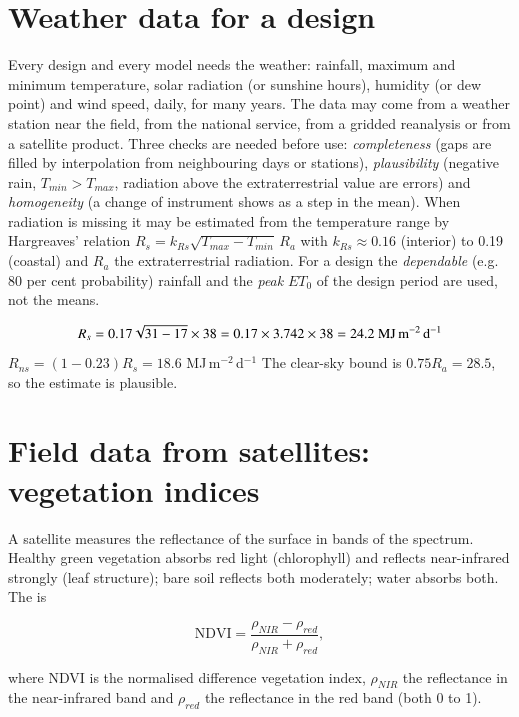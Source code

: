 \section{Weather data for a design}
Every design and every model needs the weather: rainfall, maximum and minimum temperature, solar radiation (or sunshine hours), humidity (or dew point) and wind speed, daily, for many years. The data may come from a weather station near the field, from the national service, from a gridded reanalysis or from a satellite product. Three checks are needed before use: \emph{completeness} (gaps are filled by interpolation from neighbouring days or stations), \emph{plausibility} (negative rain, $T_{min}>T_{max}$, radiation above the extraterrestrial value are errors) and \emph{homogeneity} (a change of instrument shows as a step in the mean). When radiation is missing it may be estimated from the temperature range by Hargreaves' relation $R_s=k_{Rs}\sqrt{T_{max}-T_{min}}\,R_a$ with $k_{Rs}\approx0.16$ (interior) to 0.19 (coastal) and $R_a$ the extraterrestrial radiation. For a design the \emph{dependable} (e.g. 80 per cent probability) rainfall and the \emph{peak} $ET_0$ of the design period are used, not the means.

\sol {}\ans \[R_s=0.17\sqrt{31-17}\times38=0.17\times3.742\times38=24.2\ \text{MJ\,m$^{-2}$\,d$^{-1}$}\] \ans $R_{ns}=(1-0.23)R_s=18.6$ MJ\,m$^{-2}$\,d$^{-1}$ \ans The clear-sky bound is $0.75R_a=28.5$, so the estimate is plausible. \finans

\section{Field data from satellites: vegetation indices}
A satellite measures the reflectance of the surface in bands of the spectrum. Healthy green vegetation absorbs red light (chlorophyll) and reflects near-infrared strongly (leaf structure); bare soil reflects both moderately; water absorbs both. The  is

\begin{equation}\mathrm{NDVI}=\frac{\rho_{NIR}-\rho_{red}}{\rho_{NIR}+\rho_{red}},\label{eq:ndvi6}\end{equation}
\par\noindent where NDVI is the normalised difference vegetation index, $\rho_{NIR}$ the reflectance in the near-infrared band and $\rho_{red}$ the reflectance in the red band (both 0 to 1).



